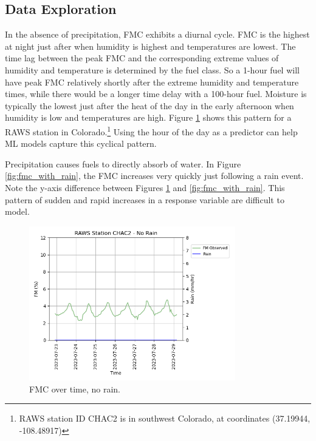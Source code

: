 \documentclass[11pt]{article}%
\begin{document}
\subsection{Data Exploration}

In the absence of precipitation, FMC exhibits a diurnal cycle. FMC is the highest at night just after when humidity is highest and temperatures are lowest. The time lag between the peak FMC and the corresponding extreme values of humidity and temperature is determined by the fuel class. So a 1-hour fuel will have peak FMC relatively shortly after the extreme humidity and temperature times, while there would be a longer time delay with a 100-hour fuel. Moisture is typically the lowest just after the heat of the day in the early afternoon when humidity is low and temperatures are high. Figure \ref{fig:fmc_no_rain} shows this pattern for a RAWS station in Colorado.\footnote{RAWS station ID CHAC2 is in southwest Colorado, at coordinates (37.19944,	-108.48917)} Using the hour of the day as a predictor can help ML models capture this cyclical pattern. 

Precipitation causes fuels to directly absorb of water. In Figure \ref{fig:fmc_with_rain}, the FMC increases very quickly just following a rain event. Note the y-axis difference between Figures \ref{fig:fmc_no_rain} and \ref{fig:fmc_with_rain}. This pattern of sudden and rapid increases in a response variable are difficult to model.

\begin{figure}[ht]
    \centering
    \includegraphics[width=0.8\textwidth]{images/no_rain_plot.png}
    \caption{FMC over time, no rain.}
    \label{fig:fmc_no_rain}
\end{figure}
\end{document}
